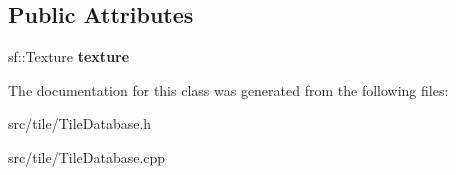 \subsection*{Public Attributes}
\begin{DoxyCompactItemize}
\item 
\hypertarget{classTileDatabase_a3368141d1a148afb5830ff86b3ca29f6}{sf\-::\-Texture {\bfseries texture}}\label{classTileDatabase_a3368141d1a148afb5830ff86b3ca29f6}

\end{DoxyCompactItemize}


The documentation for this class was generated from the following files\-:\begin{DoxyCompactItemize}
\item 
src/tile/Tile\-Database.\-h\item 
src/tile/Tile\-Database.\-cpp\end{DoxyCompactItemize}
